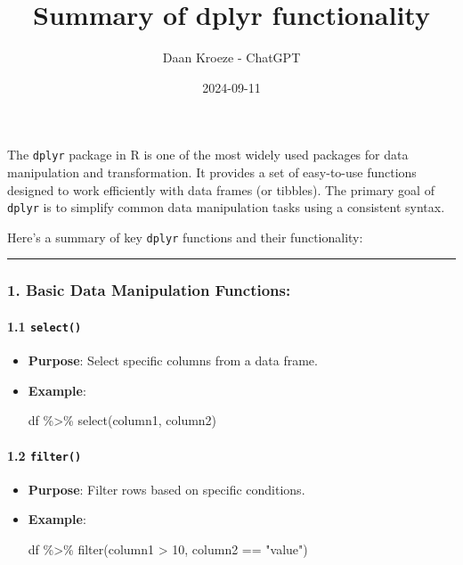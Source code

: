 \documentclass[
  letterpaper,
  DIV=11,
  numbers=noendperiod]{scrartcl}
\title{Summary of dplyr functionality}
\author{Daan Kroeze - ChatGPT}
\date{2024-09-11}
\let\oldparagraph\paragraph
\renewcommand{\paragraph}[1]{\oldparagraph{#1}\mbox{}}
\newenvironment{Shaded}{\begin{snugshade}}{\end{snugshade}}
\newcommand{\DecValTok}[1]{\textcolor[rgb]{0.68,0.00,0.00}{#1}}
\newcommand{\FunctionTok}[1]{\textcolor[rgb]{0.28,0.35,0.67}{#1}}
\newcommand{\NormalTok}[1]{\textcolor[rgb]{0.00,0.23,0.31}{#1}}
\newcommand{\SpecialCharTok}[1]{\textcolor[rgb]{0.37,0.37,0.37}{#1}}
\newcommand{\StringTok}[1]{\textcolor[rgb]{0.13,0.47,0.30}{#1}}
\begin{document}
\maketitle

The \texttt{dplyr} package in R is one of the most widely used packages
for data manipulation and transformation. It provides a set of
easy-to-use functions designed to work efficiently with data frames (or
tibbles). The primary goal of \texttt{dplyr} is to simplify common data
manipulation tasks using a consistent syntax.

Here's a summary of key \texttt{dplyr} functions and their
functionality:

\begin{center}\rule{0.5\linewidth}{0.5pt}\end{center}

\subsubsection{\texorpdfstring{1. \textbf{Basic Data Manipulation
Functions:}}{1. Basic Data Manipulation Functions:}}\label{basic-data-manipulation-functions}

\paragraph{\texorpdfstring{\textbf{1.1
\texttt{select()}}}{1.1 select()}}\label{select}

\begin{itemize}
\item
  \textbf{Purpose}: Select specific columns from a data frame.
\item
  \textbf{Example}:

\begin{Shaded}
\begin{Highlighting}[]
\NormalTok{df }\SpecialCharTok{\%\textgreater{}\%} \FunctionTok{select}\NormalTok{(column1, column2)}
\end{Highlighting}
\end{Shaded}
\end{itemize}

\paragraph{\texorpdfstring{\textbf{1.2
\texttt{filter()}}}{1.2 filter()}}\label{filter}

\begin{itemize}
\item
  \textbf{Purpose}: Filter rows based on specific conditions.
\item
  \textbf{Example}:

\begin{Shaded}
\begin{Highlighting}[]
\NormalTok{df }\SpecialCharTok{\%\textgreater{}\%} \FunctionTok{filter}\NormalTok{(column1 }\SpecialCharTok{\textgreater{}} \DecValTok{10}\NormalTok{, column2 }\SpecialCharTok{==} \StringTok{"value"}\NormalTok{)}
\end{Highlighting}
\end{Shaded}
\end{itemize}
\end{document}

